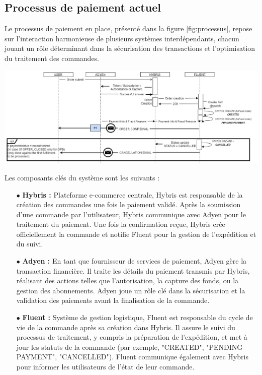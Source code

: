 \subsection{Processus de paiement actuel}
Le processus de paiement en place, présenté dans la figure \ref{fig:processus}, repose sur l'interaction harmonieuse de plusieurs systèmes interdépendants, chacun jouant un rôle déterminant dans la sécurisation des transactions et l'optimisation du traitement des commandes. 
\begin{center}
    \centering
    \includegraphics[width=19cm]{Figures/processus.jpeg}
    \label{fig:processus}
\end{center}
Les composants clés du système sont les suivants :
\begin{itemize}
    \item [$\bullet$]\textbf{Hybris :} Plateforme e-commerce centrale, Hybris est responsable de la création des commandes une fois le paiement validé. Après la soumission d'une commande par l'utilisateur, Hybris communique avec Adyen pour le traitement du paiement. Une fois la confirmation reçue, Hybris crée officiellement la commande et notifie Fluent pour la gestion de l'expédition et du suivi.
    \item [$\bullet$]\textbf{Adyen :} En tant que fournisseur de services de paiement, Adyen gère la transaction financière. Il traite les détails du paiement transmis par Hybris, réalisant des actions telles que l'autorisation, la capture des fonds, ou la gestion des abonnements. Adyen joue un rôle clé dans la sécurisation et la validation des paiements avant la finalisation de la commande.
    \item [$\bullet$]\textbf{Fluent :} Système de gestion logistique, Fluent est responsable du cycle de vie de la commande après sa création dans Hybris. Il assure le suivi du processus de traitement, y compris la préparation de l'expédition, et met à jour les statuts de la commande (par exemple, "CREATED", "PENDING PAYMENT", "CANCELLED"). Fluent communique également avec Hybris pour informer les utilisateurs de l'état de leur commande.
\end{itemize}
